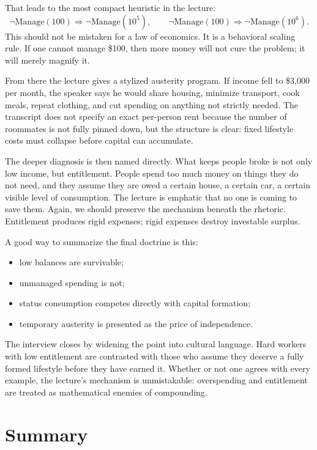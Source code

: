 That leads to the most compact heuristic in the lecture:
\begin{equation}
\neg \mathrm{Manage}(100)\Rightarrow \neg \mathrm{Manage}(10^5),\qquad
\neg \mathrm{Manage}(100)\Rightarrow \neg \mathrm{Manage}(10^6).
\end{equation}
This should not be mistaken for a law of economics. It is a behavioral scaling rule. If one cannot manage \$100, then more money will not cure the problem; it will merely magnify it.

From there the lecture gives a stylized austerity program. If income fell to \$3{,}000 per month, the speaker says he would share housing, minimize transport, cook meals, repeat clothing, and cut spending on anything not strictly needed. The transcript does not specify an exact per-person rent because the number of roommates is not fully pinned down, but the structure is clear: fixed lifestyle costs must collapse before capital can accumulate.

The deeper diagnosis is then named directly. What keeps people broke is not only low income, but entitlement. People spend too much money on things they do not need, and they assume they are owed a certain house, a certain car, a certain visible level of consumption. The lecture is emphatic that no one is coming to save them. Again, we should preserve the mechanism beneath the rhetoric. Entitlement produces rigid expenses; rigid expenses destroy investable surplus.

A good way to summarize the final doctrine is this:

\begin{itemize}
\item low balances are survivable;
\item unmanaged spending is not;
\item status consumption competes directly with capital formation;
\item temporary austerity is presented as the price of independence.
\end{itemize}

The interview closes by widening the point into cultural language. Hard workers with low entitlement are contrasted with those who assume they deserve a fully formed lifestyle before they have earned it. Whether or not one agrees with every example, the lecture's mechanism is unmistakable: overspending and entitlement are treated as mathematical enemies of compounding.

\section{Summary}

